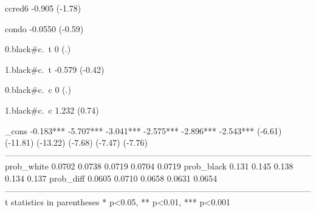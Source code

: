 \documentclass{scrartcl}
\begin{document}
\begin{STinyoutputC}
ccred6                                                                             -0.905
                                                                                  (-1.78)

condo                                                                             -0.0550
                                                                                  (-0.59)

0.black#c.~t                                                                                            0
                                                                                                      (.)

1.black#c.~t                                                                                       -0.579
                                                                                                  (-0.42)

0.black#c.~c                                                                                            0
                                                                                                      (.)

1.black#c.~c                                                                                        1.232
                                                                                                   (0.74)

_cons              -0.183***       -5.707***       -3.041***       -2.575***       -2.896***       -2.543***
                  (-6.61)        (-11.81)        (-13.22)         (-7.68)         (-7.47)         (-7.76)
------------------------------------------------------------------------------------------------------------
prob_white                         0.0702          0.0738          0.0719          0.0704          0.0719
prob_black                          0.131           0.145           0.138           0.134           0.137
prob_diff                          0.0605          0.0710          0.0658          0.0631          0.0654
------------------------------------------------------------------------------------------------------------
t statistics in parentheses
* p<0.05, ** p<0.01, *** p<0.001
\end{STinyoutputC}
\end{document}
